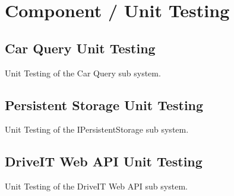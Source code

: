 \section{Component / Unit Testing}
\subsection{Car Query Unit Testing}
Unit Testing of the Car Query sub system.

\subsection{Persistent Storage Unit Testing}
Unit Testing of the IPersistentStorage sub system.

\subsection{DriveIT Web API Unit Testing}
Unit Testing of the DriveIT Web API sub system.